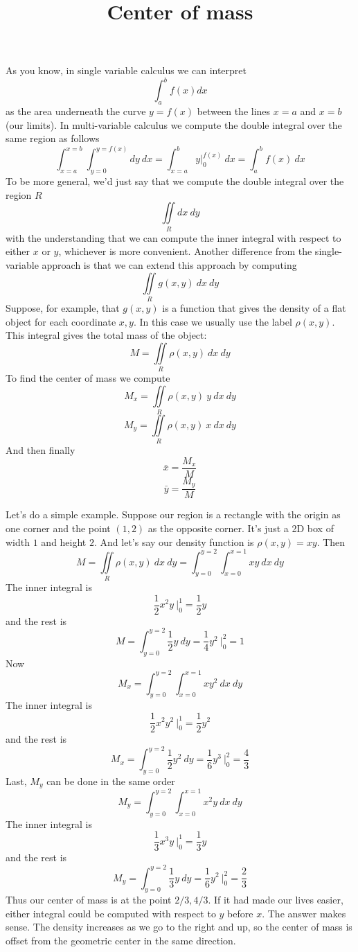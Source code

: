 \documentclass[11pt, oneside]{article}
\title{Center of mass}
\date{}
\begin{document}
\maketitle
\Large


As you know, in single variable calculus we can interpret
\[ \int_a^b f(x) dx \]
as the area underneath the curve $y=f(x)$ between the lines $x=a$ and $x=b$ (our limits).  In multi-variable calculus we compute the double integral over the same region as follows
\[ \int_{x=a}^{x=b} \int_{y=0}^{y=f(x)} dy \ dx =  \int_{x=a}^b y \bigg |_0^{f(x)}  \ dx = \int_a^b f(x) \ dx \]
To be more general, we'd just say that we compute the double integral over the region $R$
\[ \iint\limits_{R} dx \ dy  \]
with the understanding that we can compute the inner integral with respect to either $x$ or $y$, whichever is more convenient.
Another difference from the single-variable approach is that we can extend this approach by computing
\[ \iint\limits_{R} g(x,y) \ dx \ dy  \]
Suppose, for example, that $g(x,y)$ is a function that gives the density of a flat object for each coordinate $x,y$.  In this case we usually use the label $\rho (x,y)$.  This integral gives the total mass of the object:
\[ M = \iint\limits_{R} \rho (x,y) \ dx \ dy  \]
To find the center of mass we compute
\[ M_x = \iint\limits_{R} \rho (x,y)\  y \ dx \ dy  \]
\[ M_y = \iint\limits_{R} \rho (x,y) \ x \ dx \ dy \]
And then finally 
\[ \bar{x} = \frac{M_x}{M} \]
\[ \bar{y} = \frac{M_y}{M} \]
\vspace{5 mm}

\noindent
Let's do a simple example.  Suppose our region is a rectangle with the origin as one corner and the point $(1,2)$ as the opposite corner.  It's just a 2D box of width $1$ and height $2$.  And let's say our density function is $\rho (x,y) = xy$.  Then
\[ M = \iint\limits_{R} \rho (x,y) \ dx \ dy =  \int_{y=0}^{y=2} \int_{x=0}^{x=1} xy \ dx \ dy  \]
The inner integral is
\[ \frac{1}{2} x^2 y \ \bigg |_0^{1} = \frac{1}{2} y \]
and the rest is
\[ M = \int_{y=0}^{y=2} \frac{1}{2} y \ dy = \frac{1}{4} y^2 \  \bigg |_0^{2} = 1 \]
Now
\[ M_x =  \int_{y=0}^{y=2} \int_{x=0}^{x=1} xy^2 \ dx \ dy  \]
The inner integral is
\[ \frac{1}{2} x^2 y^2 \ \bigg |_0^{1} = \frac{1}{2} y^2 \]
and the rest is
\[ M_x  = \int_{y=0}^{y=2} \frac{1}{2} y^2 \ dy = \frac{1}{6} y^3 \  \bigg |_0^{2} = \frac{4}{3} \]
Last, $M_y$ can be done in the same order
\[ M_y =  \int_{y=0}^{y=2} \int_{x=0}^{x=1} x^2y \ dx \ dy  \]
The inner integral is
\[ \frac{1}{3} x^3 y \ \bigg |_0^{1} = \frac{1}{3} y \]
and the rest is
\[ M_y  = \int_{y=0}^{y=2} \frac{1}{3} y \ dy = \frac{1}{6} y^2 \  \bigg |_0^{2} = \frac{2}{3} \]
Thus our center of mass is at the point $2/3,4/3$.  If it had made our lives easier, either integral could be computed with respect to $y$ before $x$.
The answer makes sense.  The density increases as we go to the right and up, so the center of mass is offset from the geometric center in the same direction.
\end{document}
